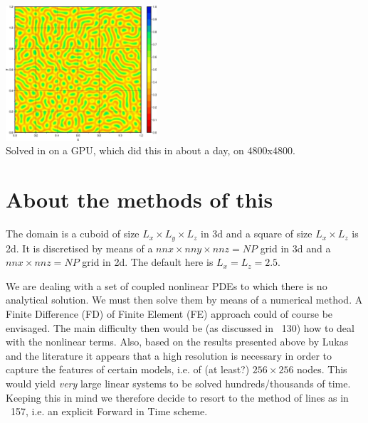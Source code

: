 \begin{center}
\includegraphics[width=5.6cm]{python_codes/fieldstone_171/images/uu000020.jpg}\\
{\captionfont Solved in on a GPU, which did this in about a day, on 4800x4800.}
\end{center}

\section*{About the methods of this \stone}

The domain is a cuboid of size $L_x \times L_y \times L_z$ in 3d and 
a square of size $L_x \times L_z$ is 2d.
It is discretised by means of a $nnx \times nny \times nnz = NP$ grid
in 3d and a $nnx \times nnz = NP$ grid in 2d.
The default here is $L_x=L_z=2.5$.

We are dealing with a set of coupled nonlinear PDEs to which there is no analytical solution.
We must then solve them by means of a numerical method. 
A Finite Difference (FD) of Finite Element (FE) approach could of course be envisaged. 
The main difficulty then would be (as discussed in \stone~130) how to deal with the 
nonlinear terms. Also, based on 
the results presented above by Lukas and the literature 
it appears that a high resolution is necessary in order
to capture the features of certain models, i.e. of (at least?) $256\times 256$ nodes. 
This would yield {\it very} large linear systems to be solved hundreds/thousands of time.
Keeping this in mind we therefore decide to resort to the method of lines as in \stone~157,
i.e. an explicit Forward in Time scheme.

